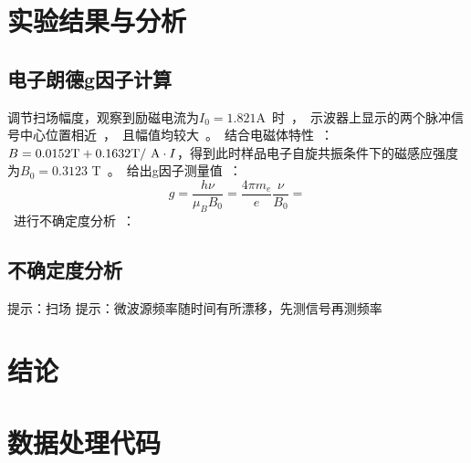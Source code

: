 \documentclass{thuemp}
\begin{document}
\section{实验结果与分析}

\subsection{电子朗德g因子计算}

调节扫场幅度，观察到励磁电流为$I_0 = 1.821$\si\ampere 时，示波器上显示的两个脉冲信号中心位置相近，且幅值均较大。结合电磁体特性：$B = 0.0152 \text{\si\tesla} + 0.1632 \text{\si\tesla / \si\ampere} \cdot I$，得到此时样品电子自旋共振条件下的磁感应强度为$B_0 = 0.3123$ \si\tesla。给出g因子测量值：

\begin{equation}
g = \frac{h \nu}{\mu_B B_0} = \frac{4\pi m_e}{e} \frac{\nu}{B_0}= 
\end{equation}

进行不确定度分析：

\subsection{不确定度分析}

提示：扫场
提示：微波源频率随时间有所漂移，先测信号再测频率

\section{结论}



\renewcommand\refname{\heiti\wuhao\centerline{参考文献}\global\def\refname{参考文献}}
\vskip 12pt

\let\OLDthebibliography\thebibliography
\renewcommand\thebibliography[1]{
  \OLDthebibliography{#1}
  \setlength{\parskip}{0pt}
  \setlength{\itemsep}{0pt plus 0.3ex}
}

{
\renewcommand{\baselinestretch}{0.9}
\liuhao


}

\appendix
\section{数据处理代码}
\end{document}
